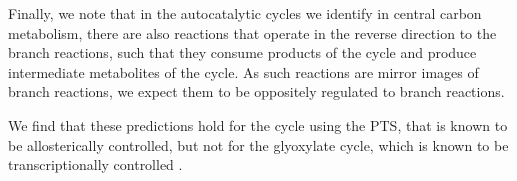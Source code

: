     Finally, we note that in the autocatalytic cycles we identify in central carbon metabolism, there are also reactions that operate in the reverse direction to the branch reactions, such that they consume products of the cycle and produce intermediate metabolites of the cycle.
    As such reactions are mirror images of branch reactions, we expect them to be oppositely regulated to branch reactions.

    We find that these predictions hold for the cycle using the PTS, that is known to be allosterically controlled, but not for the glyoxylate cycle, which is known to be transcriptionally controlled \cite{Gerosa2015-oq}.

\renewcommand\thesubsection{}
  \label{sec:allosteric}
